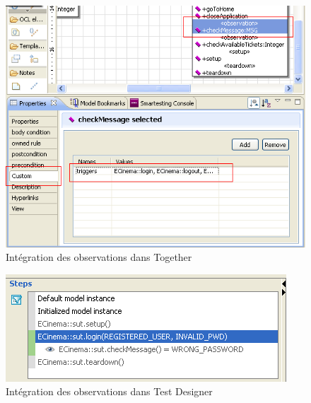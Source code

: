 \begin{figure}[!ht]
\centering
\includegraphics[scale=0.5]{Illustrations/Observation_Trigger_Together.png}
\caption{Intégration des observations dans Together}
\label{figure:obsTriggerTG}
\end{figure}
\begin{figure}[!ht]
\centering
\includegraphics[scale=0.5]{Illustrations/Observation.png}
\caption{Intégration des observations dans Test Designer}
\label{figure:obsTD}
\end{figure}
